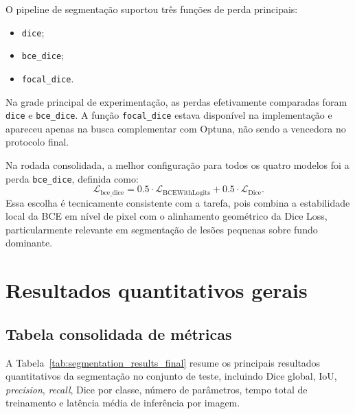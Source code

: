 \documentclass[tcc,capa]{texufpel}
\begin{document}
O pipeline de segmentação suportou três funções de perda principais:
\begin{itemize}
	\item \texttt{dice};
	\item \texttt{bce\_dice};
	\item \texttt{focal\_dice}.
\end{itemize}

Na grade principal de experimentação, as perdas efetivamente comparadas foram \texttt{dice} e \texttt{bce\_dice}. A função \texttt{focal\_dice} estava disponível na implementação e apareceu apenas na busca complementar com Optuna, não sendo a vencedora no protocolo final.

Na rodada consolidada, a melhor configuração para todos os quatro modelos foi a perda \texttt{bce\_dice}, definida como:
\begin{equation}
	\mathcal{L}_{\text{bce\_dice}}
	=
	0.5 \cdot \mathcal{L}_{\text{BCEWithLogits}}
	+
	0.5 \cdot \mathcal{L}_{\text{Dice}}.
\end{equation}
Essa escolha é tecnicamente consistente com a tarefa, pois combina a estabilidade local da BCE em nível de pixel com o alinhamento geométrico da Dice Loss, particularmente relevante em segmentação de lesões pequenas sobre fundo dominante.

\section{Resultados quantitativos gerais}

\subsection{Tabela consolidada de métricas}

A Tabela~\ref{tab:segmentation_results_final} resume os principais resultados quantitativos da segmentação no conjunto de teste, incluindo Dice global, IoU, \textit{precision}, \textit{recall}, Dice por classe, número de parâmetros, tempo total de treinamento e latência média de inferência por imagem.
\end{document}
